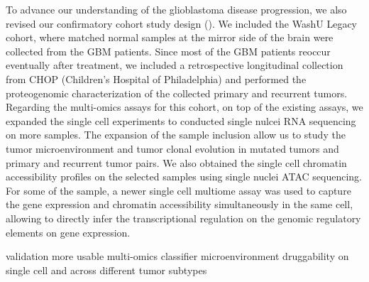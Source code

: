 To advance our understanding of the glioblastoma disease progression, we also revised our confirmatory cohort study design (). We included the WashU Legacy cohort, where matched normal samples at the mirror side of the brain were collected from the GBM patients. Since most of the GBM patients reoccur eventually after treatment, we included a retrospective longitudinal collection from CHOP (Children's Hospital of Philadelphia) and performed the proteogenomic characterization of the collected primary and recurrent tumors. Regarding the multi-omics assays for this cohort, on top of the existing assays, we expanded the single cell experiments to conducted single nulcei RNA sequencing on more samples. The expansion of the sample inclusion allow us to study the tumor microenvironment and tumor clonal evolution in  mutated tumors and primary and recurrent tumor pairs. We also obtained the single cell chromatin accessibility profiles on the selected samples using single nuclei ATAC sequencing. For some of the sample, a newer single cell multiome assay was used to capture the gene expression and chromatin accessibility simultaneously in the same cell, allowing to directly infer the transcriptional regulation on the genomic regulatory elements on gene expression.


validation
more usable multi-omics classifier
microenvironment
druggability on single cell and across different tumor subtypes
